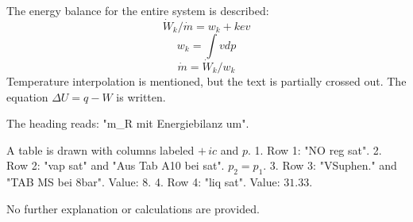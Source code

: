 The energy balance for the entire system is described:  
\[
\dot{W}_k / \dot{m} = w_k + kev
\]  
\[
w_k = \int v dp
\]  
\[
\dot{m} = \dot{W}_k / w_k
\]  
Temperature interpolation is mentioned, but the text is partially crossed out.  
The equation \(\Delta U = q - W\) is written.

The heading reads: "m_R mit Energiebilanz um".  

A table is drawn with columns labeled \( + \, ic \) and \( p \).  
1. Row 1: "NO reg sat".  
2. Row 2: "vap sat" and "Aus Tab A10 bei sat". \( p_2 = p_1 \).  
3. Row 3: "VSuphen." and "TAB MS bei 8bar". Value: \( 8 \).  
4. Row 4: "liq sat". Value: \( 31.33 \).  

No further explanation or calculations are provided.